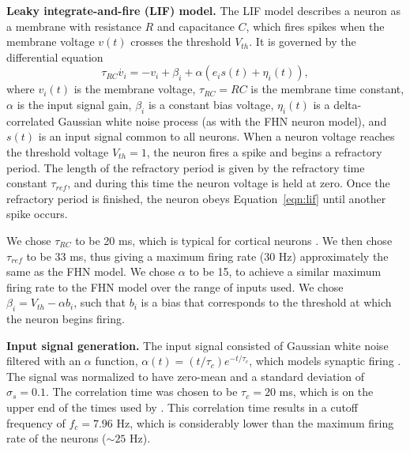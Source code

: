 \documentclass[letterpaper,11pt]{article}
\begin{document}
\textbf{Leaky integrate-and-fire (LIF) model.} The LIF model describes a neuron as a membrane with resistance $R$ and capacitance $C$, which fires spikes when the membrane voltage $v(t)$ crosses the threshold $V_{th}$. It is governed by the differential equation
\begin{equation}
  \tau_{RC} \dot{v_i} = -v_i + \beta_i + \alpha \left( e_i s(t) + \eta_i(t) \right),
  \label{eqn:lif}
\end{equation}
where $v_i(t)$ is the membrane voltage, $\tau_{RC} = RC$ is the membrane time constant, $\alpha$ is the input signal gain, $\beta_i$ is a constant bias voltage, $\eta_i(t)$ is a delta-correlated Gaussian white noise process (as with the FHN neuron model), and $s(t)$ is an input signal common to all neurons. When a neuron voltage reaches the threshold voltage $V_{th} = 1$, the neuron fires a spike and begins a refractory period. The length of the refractory period is given by the refractory time constant $\tau_{ref}$, and during this time the neuron voltage is held at zero. Once the refractory period is finished, the neuron obeys Equation~\ref{eqn:lif} until another spike occurs.

We chose $\tau_{RC}$ to be 20 ms, which is typical for cortical neurons \citep{McCormick1985}. We then chose $\tau_{ref}$ to be 33 ms, thus giving a maximum firing rate (30 Hz) approximately the same as the FHN model. We chose $\alpha$ to be 15, to achieve a similar maximum firing rate to the FHN model over the range of inputs used. We chose $\beta_i = V_{th} - \alpha b_i$, such that $b_i$ is a bias that corresponds to the threshold at which the neuron begins firing.


\textbf{Input signal generation.} The input signal consisted of Gaussian white noise filtered with an $\alpha$ function, $\alpha(t) = (t / \tau_c) e^{-t / \tau_c}$, which models synaptic firing \citep{Galan2008}. The signal was normalized to have zero-mean and a standard deviation of $\sigma_s = 0.1$. The correlation time was chosen to be $\tau_c = 20$ ms, which is on the upper end of the times used by \cite{Mainen1995}. This correlation time results in a cutoff frequency of $f_c = 7.96$ Hz, which is considerably lower than the maximum firing rate of the neurons ($\sim 25$ Hz).
\end{document}
